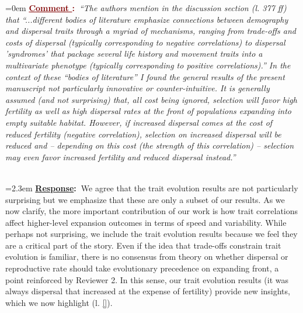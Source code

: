 \documentclass[12pt]{article}
\newcounter{cN}
\newcommand{\comment}[1]{
	\vspace{2em}
	\refstepcounter{cN} %
	\noindent \hangindent=0em \textbf{\textcolor{Maroon}{\uline{Comment \thecN}:~}}\emph{``#1''}
	}
\newcommand{\response}[1]{
	\\[0.25em]
	\hangindent=2.3em \textbf{\textcolor{NavyBlue}{\uline{Response}:~}}#1
	}
\begin{document}
\comment{The authors mention in the discussion section (l. 377 ff) that ``...different bodies of literature emphasize connections between demography and dispersal traits through a myriad of mechanisms, ranging from trade-offs and costs of dispersal (typically corresponding to negative correlations) to dispersal 'syndromes' that package several life history and movement traits into a multivariate phenotype (typically corresponding to positive correlations).''
In the context of these ``bodies of literature'' I found the general results of the present manuscript not particularly innovative or counter-intuitive.
It is generally assumed (and not surprising) that, all cost being ignored, selection will favor high fertility as well as high dispersal rates at the front of populations expanding into empty suitable habitat.
However, if increased dispersal comes at the cost of reduced fertility (negative correlation), selection on increased dispersal will be reduced and – depending on this cost (the strength of this correlation) – selection may even favor increased fertility and reduced dispersal instead.}
\response{We agree that the trait evolution results are not particularly surprising but we emphasize that these are only a subset of our results. 
As we now clarify, the more important contribution of our work is how trait correlations affect higher-level expansion outcomes in terms of speed and variability.
While perhaps not surprising, we include the trait evolution results because we feel they are a critical part of the story.
Even if the idea that trade-offs constrain trait evolution is familiar, there is no consensus from theory on whether dispersal or reproductive rate should take evolutionary precedence on expanding front, a point reinforced by Reviewer 2. 
In this sense, our trait evolution results (it was always dispersal that increased at the expense of fertility) provide new insights, which we now highlight (l. \ref{}).}
\end{document}
